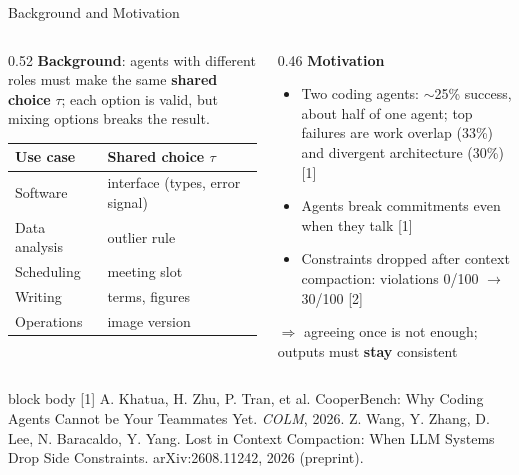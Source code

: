 \documentclass[aspectratio=169,11pt]{beamer}
\newcommand{\papercite}[1]{%
  \vfill
  \begin{beamercolorbox}[wd=\textwidth,sep=3pt]{block body}
    \tiny #1
  \end{beamercolorbox}}
\begin{document}
\begin{frame}{Background and Motivation}
  \begin{columns}[T]
    \begin{column}{0.52\textwidth}
      \footnotesize\textbf{Background}: agents with different roles must make the same \textbf{shared choice} $\tau$; each option is valid, but mixing options breaks the result.\\[4pt]
      \begin{tabular}{ll}
        \toprule
        Use case & Shared choice $\tau$ \\
        \midrule
        Software & interface (types, error signal) \\
        Data analysis & outlier rule \\
        Scheduling & meeting slot \\
        Writing & terms, figures \\
        Operations & image version \\
        \bottomrule
      \end{tabular}
    \end{column}
    \begin{column}{0.46\textwidth}
      \footnotesize\textbf{Motivation}
      \begin{itemize}
        \item Two coding agents: $\sim$25\% success, about half of one agent; top failures are work overlap (33\%) and divergent architecture (30\%) [1]
        \item Agents break commitments even when they talk [1]
        \item Constraints dropped after context compaction: violations 0/100 $\to$ 30/100 [2]
      \end{itemize}
      \vspace{0.2em}
      $\Rightarrow$ agreeing once is not enough; outputs must \textbf{stay} consistent
    \end{column}
  \end{columns}
  \papercite{[1] A. Khatua, H. Zhu, P. Tran, et al. CooperBench: Why Coding Agents Cannot be Your Teammates Yet. \textit{COLM}, 2026. \;
  [2] Z. Wang, Y. Zhang, D. Lee, N. Baracaldo, Y. Yang. Lost in Context Compaction: When LLM Systems Drop Side Constraints. arXiv:2608.11242, 2026 (preprint).}
\end{frame}
\end{document}
